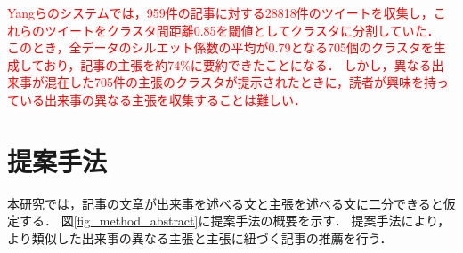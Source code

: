 \documentclass[12pt,a4j]{jreport}
\begin{document}
\textcolor{red}{
Yangらのシステムでは，959件の記事に対する28818件のツイートを収集し，これらのツイートをクラスタ間距離0.85を閾値としてクラスタに分割していた．
このとき，全データのシルエット係数の平均が0.79となる705個のクラスタを生成しており，記事の主張を約74\%に要約できたことになる．
しかし，異なる出来事が混在した705件の主張のクラスタが提示されたときに，読者が興味を持っている出来事の異なる主張を収集することは難しい．
}







\chapter{提案手法}
\label{chapter_method}

本研究では，記事の文章が出来事を述べる文と主張を述べる文に二分できると仮定する．
図\ref{fig_method_abstract}に提案手法の概要を示す．
提案手法により，より類似した出来事の異なる主張と主張に紐づく記事の推薦を行う．
\end{document}
